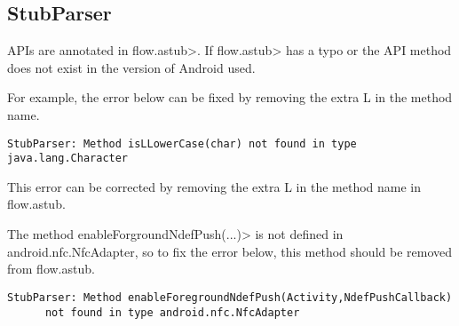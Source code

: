 \subsection{StubParser}

APIs are annotated in \<flow.astub>.  If \<flow.astub> has a typo or the API method does not exist in the version of Android 
used. 

For example, the error below can be fixed by removing the extra L in the method name.

\begin{Verbatim}
StubParser: Method isLLowerCase(char) not found in type java.lang.Character
\end{Verbatim}
This error can be corrected by removing the extra L in the method name in flow.astub.

The method \<enableForgroundNdefPush(...)> is not defined in android.nfc.NfcAdapter, so to fix the error below, this
 method should be removed from flow.astub.
\begin{Verbatim}
StubParser: Method enableForegroundNdefPush(Activity,NdefPushCallback) 
      not found in type android.nfc.NfcAdapter
\end{Verbatim}

